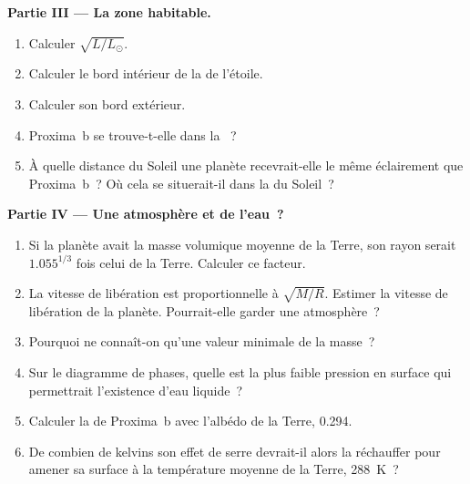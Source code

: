 \begin{problem}
\medskip
\noindent\textbf{Partie III --- La zone habitable.}
\begin{enumerate}[resume]
  \item Calculer $\sqrt{L/L_\odot}$.
  \item Calculer le bord intérieur de la  de l'étoile.
  \item Calculer son bord extérieur.
  \item Proxima~b se trouve-t-elle dans la ~?
  \item À quelle distance du Soleil une planète recevrait-elle le même
        éclairement que Proxima~b~? Où cela se situerait-il dans la  du Soleil~?
\end{enumerate}

\medskip
\noindent\textbf{Partie IV --- Une atmosphère et de l'eau~?}
\begin{enumerate}[resume]
  \item Si la planète avait la masse volumique moyenne de la Terre, son
        rayon serait $1.055^{1/3}$ fois celui de la Terre. Calculer ce
        facteur.
  \item La vitesse de libération est proportionnelle à $\sqrt{M/R}$.
        Estimer la vitesse de libération de la planète. Pourrait-elle garder
        une atmosphère~?
  \item Pourquoi ne connaît-on qu'une valeur minimale de la masse~?
  \item Sur le diagramme de phases, quelle est la plus faible pression en
        surface qui permettrait l'existence d'eau liquide~?
  \item Calculer la  de Proxima~b avec l'albédo de
        la Terre, 0.294.
  \item De combien de kelvins son effet de serre devrait-il alors la
        réchauffer pour amener sa surface à la température moyenne de la
        Terre, \qty{288}{K}~?
\end{enumerate}
\end{problem}
